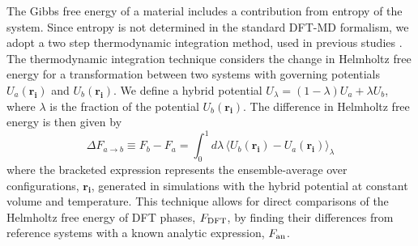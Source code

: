 
The Gibbs free energy of a material includes a contribution from entropy of the system.
Since entropy is not determined in the standard DFT-MD formalism, we adopt a two step
thermodynamic integration method, used in previous studies
\citep{Wilson2010,Wilson2012a,Wahl2013,Gonzalez2014}.  The thermodynamic integration technique
considers the change in Helmholtz free energy for a transformation between two systems
with governing potentials $U_a\left(\mathbf{r_i}\right)$ and
$U_b\left(\mathbf{r_i}\right)$. We define a hybrid potential
$U_{\lambda}=\left(1-\lambda\right)U_a+\lambda U_b$, where $\lambda$ is the fraction of
the potential $U_b\left(\mathbf{r_i}\right)$. The difference in Helmholtz free energy is
then given by
\begin{equation} \label{eqn:td_int}
  \Delta F_{a\to b}\equiv F_b - F_a = \int_{0}^{1}{d\lambda\,\langle U_b\left(\mathbf{r_i}\right) -
  U_a\left(\mathbf{r_i}\right) \rangle_{\lambda}}
\end{equation}
where the bracketed expression represents the ensemble-average over configurations,
$\mathbf{r_i}$, generated in simulations with the hybrid potential at constant volume and
temperature. This technique allows for direct comparisons of the Helmholtz free energy of
DFT phases, $F_{\rm DFT}$, by finding their differences from reference systems with a known
analytic expression, $F_{\rm an}$. 

